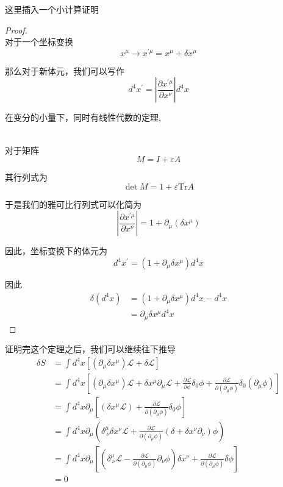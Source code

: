 这里插入一个小计算证明
\begin{proof}
    \ \\对于一个坐标变换\[x^\mu\to x^{\prime \mu}=x^\mu+\delta x^\mu\]

    那么对于新体元，我们可以写作
    \begin{equation*}
        d^4x^\prime=\left|\frac{\partial x^{\prime\mu}}{\partial x^\nu}\right|d^4x
    \end{equation*}

    在变分的小量下，同时有线性代数的定理,
    \begin{theorem}
        \ \\对于矩阵
        \begin{equation*}
            M=I+\varepsilon A
        \end{equation*}

        其行列式为
        \begin{equation*}
            \det M=1+\varepsilon\text{Tr}A
        \end{equation*}
    \end{theorem}
    
    于是我们的雅可比行列式可以化简为
    \begin{equation*}
        \left|\frac{\partial x^{\prime\mu}}{\partial x^\nu}\right|=1+\partial_\mu(\delta x^\mu)
    \end{equation*}

    因此，坐标变换下的体元为
    \begin{equation*}
        d^4x^\prime=(1+\partial_\mu\delta x^\mu)d^4x
    \end{equation*}

    因此
    \begin{align*}
        \delta(d^4x)&=(1+\partial_\mu\delta x^\mu)d^4x-d^4x\\
        &=\partial_\mu\delta x^\mu d^4x
    \end{align*}
\end{proof}

证明完这个定理之后，我们可以继续往下推导
\begin{align*}
    \delta S&=\int d^4x \left[\left(\partial_\mu\delta x^\mu\right)\mathcal{L}+\delta\mathcal{L}\right]\\
    &=\int d^4x \left[\left(\partial_\mu\delta x^\mu\right)\mathcal{L}+\delta x^\mu\partial_\mu\mathcal{L}+\frac{\partial \mathcal{L}}{\partial\phi}\delta_0\phi+\frac{\partial \mathcal{L}}{\partial (\partial_\mu\phi)}\delta_0(\partial_\mu\phi)\right]\\
    &=\int d^4x \partial_\mu\left[\left(\delta x^\mu \mathcal{L}\right)+\frac{\partial\mathcal{L}}{\partial(\partial_\mu\phi)}\delta_0\phi\right]\\
    &=\int d^4x \partial_\mu \left(\delta^\mu_{\ \nu}\delta x^\nu\mathcal{L}+\frac{\partial\mathcal{L}}{\partial(\partial_\mu\phi)}\left(\delta+\delta x^\nu\partial_\nu\right)\phi\right)\\
    &=\int d^4x \partial_\mu\left[\left(\delta^\mu_{\ \nu}\mathcal{L}-\frac{\partial\mathcal{L}}{\partial(\partial_\mu\phi)}\partial_\nu\phi\right)\delta x^\nu+\frac{\partial\mathcal{L}}{\partial(\partial_\mu\phi)}\delta\phi\right]\\
    &=0
\end{align*}

